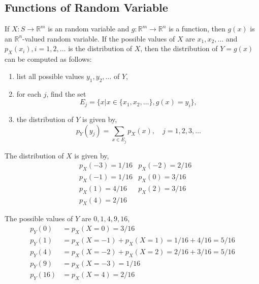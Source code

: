 \subsection{Functions of Random Variable}
If $X : S \rightarrow \mathbb{R}^m$ is an random variable and $g : \mathbb{R}^m
\rightarrow \mathbb{R}^n$ is a function, then $g(x)$ is an
$\mathbb{R}^n$-valued random variable. If the possible values of $X$ are $x_1,
x_2, \dots$ and $p_X(x_i), i = 1, 2, \dots$ is the distribution of $X$, then
the distribution of $Y = g(x)$ can be computed as follows:
\begin{enumerate}[noitemsep, topsep=0em]
    \item list all possible values $y_1, y_2, \dots$ of $Y$, 
    \item for each $j$, find the set 
          \[ E_j = \lbrace x \vert x \in \lbrace x_1, x_2, \dots \rbrace, 
                                   g(x) = y_i \rbrace,                       \]
    \item the distribution of $Y$ is given by,
          \begin{equation*}
              p_Y(y_j) = \sum_{x \in E_j} p_X(x), \quad j = 1, 2, 3, \dots
          \end{equation*}
\end{enumerate}

\begin{example}
    The distribution of $X$ is given by,
    \begin{align*}
        &p_X(-3) = 1 / 16                    &p_X(-2) = 2 / 16              \\
        &p_X(-1) = 1 / 16                    &p_X(0)  = 3 / 16              \\
        &p_X(1)  = 4 / 16                    &p_X(2)  = 3 / 16              \\
        &p_X(4)  = 2 / 16                    &\quad
    \end{align*}
\end{example}
\begin{solution}
    The possible values of $Y$ are $0, 1, 4, 9, 16$,
    \begin{align*}
        p_Y(0) &= p_X(X = 0) = 3 / 16                                      \\
        p_Y(1) &= p_X(X = -1) + p_X(X = 1) = 1 / 16 + 4 / 16 = 5 / 16      \\
        p_Y(4) &= p_X(X = -2) + p_X(X = 2) = 2 / 16 + 3 / 16 = 5 / 16      \\
        p_Y(9) &= p_X(X = -3) = 1 / 16                                     \\
        p_Y(16) &= p_X(X = 4) = 2 / 16
    \end{align*}
\end{solution}